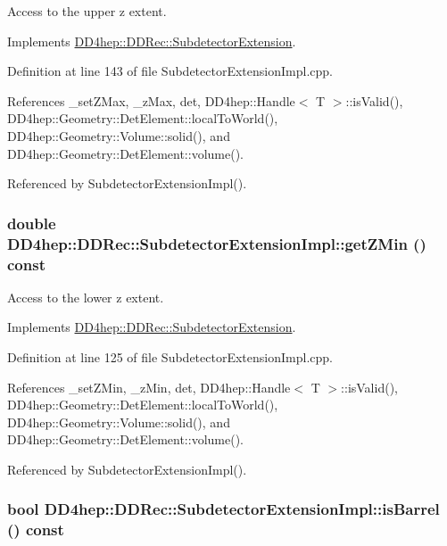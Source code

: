 Access to the upper z extent. 

Implements \hyperlink{class_d_d4hep_1_1_d_d_rec_1_1_subdetector_extension_aea56290179f8271d6a2a3be1658d9b47}{DD4hep::DDRec::SubdetectorExtension}.

Definition at line 143 of file SubdetectorExtensionImpl.cpp.

References \_\-setZMax, \_\-zMax, det, DD4hep::Handle$<$ T $>$::isValid(), DD4hep::Geometry::DetElement::localToWorld(), DD4hep::Geometry::Volume::solid(), and DD4hep::Geometry::DetElement::volume().

Referenced by SubdetectorExtensionImpl().\hypertarget{class_d_d4hep_1_1_d_d_rec_1_1_subdetector_extension_impl_afe7437d86975e37f4b81e61631145591}{
\subsubsection[{getZMin}]{\setlength{\rightskip}{0pt plus 5cm}double DD4hep::DDRec::SubdetectorExtensionImpl::getZMin () const}}
\label{class_d_d4hep_1_1_d_d_rec_1_1_subdetector_extension_impl_afe7437d86975e37f4b81e61631145591}


Access to the lower z extent. 

Implements \hyperlink{class_d_d4hep_1_1_d_d_rec_1_1_subdetector_extension_a5229b92c90c65a76156b5ea082aa0301}{DD4hep::DDRec::SubdetectorExtension}.

Definition at line 125 of file SubdetectorExtensionImpl.cpp.

References \_\-setZMin, \_\-zMin, det, DD4hep::Handle$<$ T $>$::isValid(), DD4hep::Geometry::DetElement::localToWorld(), DD4hep::Geometry::Volume::solid(), and DD4hep::Geometry::DetElement::volume().

Referenced by SubdetectorExtensionImpl().\hypertarget{class_d_d4hep_1_1_d_d_rec_1_1_subdetector_extension_impl_a3a024678317cb6cf0f0794c041b70b96}{
\subsubsection[{isBarrel}]{\setlength{\rightskip}{0pt plus 5cm}bool DD4hep::DDRec::SubdetectorExtensionImpl::isBarrel () const}}
\label{class_d_d4hep_1_1_d_d_rec_1_1_subdetector_extension_impl_a3a024678317cb6cf0f0794c041b70b96}


